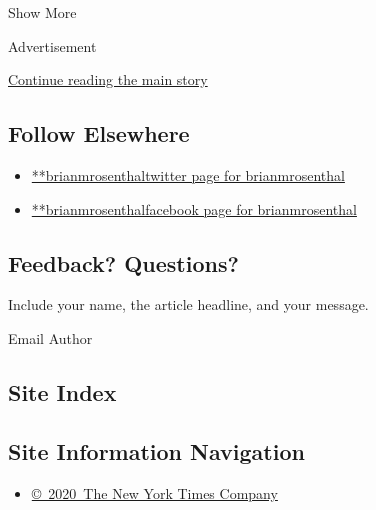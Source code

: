 Show More

Advertisement

\protect\hyperlink{after-mid2}{Continue reading the main story}

\hypertarget{follow-elsewhere}{%
\subsection{Follow Elsewhere}\label{follow-elsewhere}}

\begin{itemize}
\tightlist
\item
  \href{https://twitter.com/brianmrosenthal}{**brianmrosenthaltwitter
  page for brianmrosenthal}
\item
  \href{https://www.facebookcorewwwi.onion/brianmrosenthal}{**brianmrosenthalfacebook
  page for brianmrosenthal}
\end{itemize}

\hypertarget{feedback-questions}{%
\subsection{Feedback? Questions?}\label{feedback-questions}}

Include your name, the article headline, and your message.

Email Author

\hypertarget{site-index}{%
\subsection{Site Index}\label{site-index}}

\hypertarget{site-information-navigation}{%
\subsection{Site Information
Navigation}\label{site-information-navigation}}

\begin{itemize}
\tightlist
\item
  \href{https://help.nytimes3xbfgragh.onion/hc/en-us/articles/115014792127-Copyright-notice}{©~2020~The
  New York Times Company}
\end{itemize}

